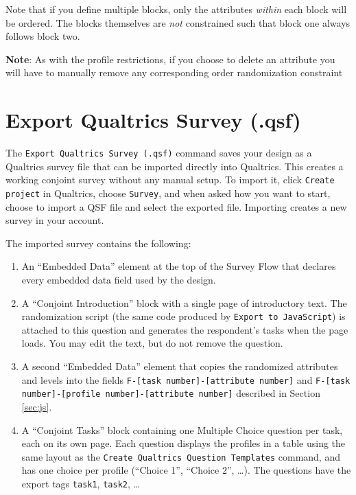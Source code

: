 \documentclass[12pt]{article}
\begin{document}
Note that if you define multiple blocks, only the attributes \textit{within} each block will be ordered. The blocks themselves are \textit{not} constrained such that block one always follows block two.

\textbf{Note}: As with the profile restrictions, if you choose to delete an attribute you will have to manually remove any corresponding order randomization constraint 

\section{Export Qualtrics Survey (.qsf)}\label{sec:qsf}

The \texttt{Export Qualtrics Survey (.qsf)} command saves your design as a Qualtrics survey file that can be imported directly into Qualtrics. This creates a working conjoint survey without any manual setup. To import it, click \texttt{Create project} in Qualtrics, choose \texttt{Survey}, and when asked how you want to start, choose to import a QSF file and select the exported file. Importing creates a new survey in your account.

The imported survey contains the following:

\begin{enumerate}
\item An ``Embedded Data'' element at the top of the Survey Flow that declares every embedded data field used by the design.
\item A ``Conjoint Introduction'' block with a single page of introductory text. The randomization script (the same code produced by \texttt{Export to JavaScript}) is attached to this question and generates the respondent's tasks when the page loads. You may edit the text, but do not remove the question.
\item A second ``Embedded Data'' element that copies the randomized attributes and levels into the fields \texttt{F-[task number]-[attribute number]} and \texttt{F-[task number]-[profile number]-[attribute number]} described in Section \ref{sec:js}.
\item A ``Conjoint Tasks'' block containing one Multiple Choice question per task, each on its own page. Each question displays the profiles in a table using the same layout as the \texttt{Create Qualtrics Question Templates} command, and has one choice per profile (``Choice 1'', ``Choice 2'', \ldots). The questions have the export tags \texttt{task1}, \texttt{task2}, \ldots
\end{enumerate}
\end{document}
